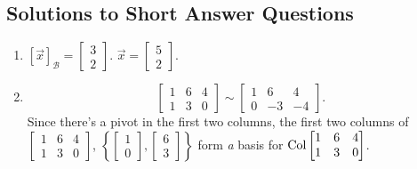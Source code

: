 \subsection{Solutions to Short Answer Questions}
	\begin{enumerate}
		\item \([\vec{x}]_\mathcal{B} = \begin{bmatrix}3 \\ 2\end{bmatrix}\). \(\vec{x} = \begin{bmatrix}5 \\ 2\end{bmatrix}\).
		\item \[\begin{bmatrix}1 & 6 & 4 \\ 1 & 3 & 0\end{bmatrix} \sim \begin{bmatrix}1 & 6 & 4 \\ 0 & -3 & -4\end{bmatrix}.\] 
			Since there's a pivot in the first two columns, the first two columns of \(\begin{bmatrix}1 & 6 & 4 \\ 1 & 3 & 0\end{bmatrix}\), 
			\(\left\{\begin{bmatrix}1 \\ 0\end{bmatrix}, \begin{bmatrix}6 \\ 3\end{bmatrix}\right\}\) form \emph{a} basis for 
			\(\operatorname{Col} \begin{bmatrix}1 & 6 & 4 \\ 1 & 3 & 0\end{bmatrix}\).
		

\end{enumerate}
